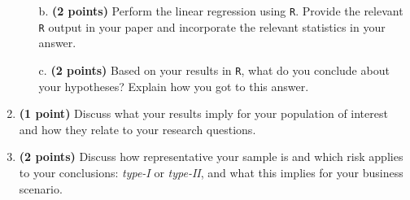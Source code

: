 \begin{enumerate}
\begin{enumerate}
        \item[b.] \textbf{(2 points)} Perform the linear regression using \texttt{R}. Provide the relevant \texttt{R} output in your paper and incorporate the relevant statistics in your answer.
        \item[c.] \textbf{(2 points)} Based on your results in \texttt{R}, what do you conclude about your hypotheses? Explain how you got to this answer.
    \end{enumerate}
    \item \textbf{(1 point)} Discuss what your results imply for your population of interest and how they relate to your research questions.
    \item \textbf{(2 points)} Discuss how representative your sample is and which risk applies to your conclusions: \textit{type-I} or \textit{type-II}, and what this implies for your business scenario.
\end{enumerate}

\clearpage %
